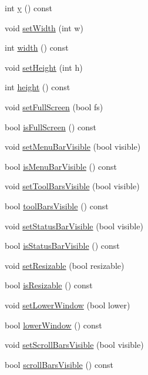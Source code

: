 \begin{DoxyCompactItemize}
\item 
int \hyperlink{classKParts_1_1WindowArgs_a3fcb463bb6b6e87fd9cd9fdd55ecd30b}{y} () const 
\item 
void \hyperlink{classKParts_1_1WindowArgs_a4af288c9b6ace9560aa5fc1e5af39de3}{set\+Width} (int w)
\item 
int \hyperlink{classKParts_1_1WindowArgs_a2e71e88878e5ed699cdc591715eee509}{width} () const 
\item 
void \hyperlink{classKParts_1_1WindowArgs_a85a07a9fafa90d79edfd338ad2a9dae5}{set\+Height} (int h)
\item 
int \hyperlink{classKParts_1_1WindowArgs_abc7756c372df99be8d83bc6e1574734a}{height} () const 
\item 
void \hyperlink{classKParts_1_1WindowArgs_a9779524444f507933ea314f5e31c893e}{set\+Full\+Screen} (bool fs)
\item 
bool \hyperlink{classKParts_1_1WindowArgs_a5bd1ed448fedb091f633c82104abdf97}{is\+Full\+Screen} () const 
\item 
void \hyperlink{classKParts_1_1WindowArgs_a8ea1f1f5a6fbc6f8db6b1564fb36926c}{set\+Menu\+Bar\+Visible} (bool visible)
\item 
bool \hyperlink{classKParts_1_1WindowArgs_abf3d15dc8f4267d1e3ad8e2bcb846283}{is\+Menu\+Bar\+Visible} () const 
\item 
void \hyperlink{classKParts_1_1WindowArgs_a14a892eb0edb68e49056e751bebf6425}{set\+Tool\+Bars\+Visible} (bool visible)
\item 
bool \hyperlink{classKParts_1_1WindowArgs_ac87b860b3157db4f6c5d1d512b3cfb8c}{tool\+Bars\+Visible} () const 
\item 
void \hyperlink{classKParts_1_1WindowArgs_acde0aa5cbc892404c4c3a8bfd9829eba}{set\+Status\+Bar\+Visible} (bool visible)
\item 
bool \hyperlink{classKParts_1_1WindowArgs_af2932404a1a223126e60e31737c62e11}{is\+Status\+Bar\+Visible} () const 
\item 
void \hyperlink{classKParts_1_1WindowArgs_a238f7aa7f8aebea2180d7b7cafa961c4}{set\+Resizable} (bool resizable)
\item 
bool \hyperlink{classKParts_1_1WindowArgs_a8031d2745585e35410e834ed5e7f1265}{is\+Resizable} () const 
\item 
void \hyperlink{classKParts_1_1WindowArgs_adebf8b4fb811f068cba27e6e2a050f0b}{set\+Lower\+Window} (bool lower)
\item 
bool \hyperlink{classKParts_1_1WindowArgs_a437e2bf77cfcd30b1d98b6160a4f4f2d}{lower\+Window} () const 
\item 
void \hyperlink{classKParts_1_1WindowArgs_a3f861f5f5ed4719e9c3d4ee8a688d18a}{set\+Scroll\+Bars\+Visible} (bool visible)
\item 
bool \hyperlink{classKParts_1_1WindowArgs_a9eb6ebe54b896f33f84d1379c71be18a}{scroll\+Bars\+Visible} () const 
\end{DoxyCompactItemize}


